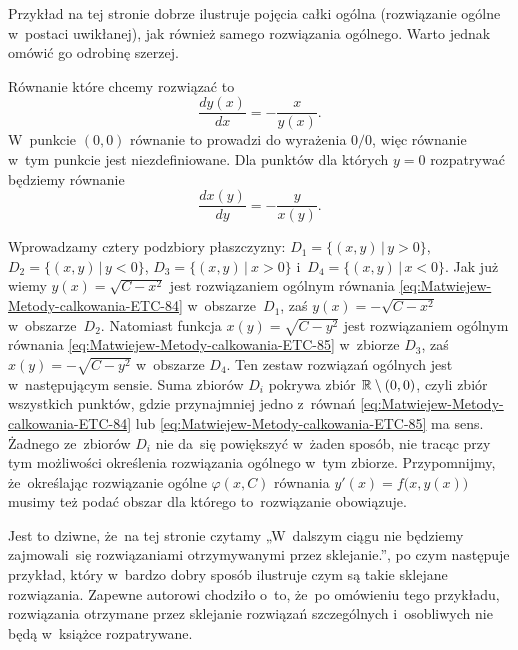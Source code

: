 \documentclass[a4paper,11pt]{article}
\numberwithin{equation}{section}
\begin{document}
\VerSpaceFour





\noindent
{} Przykład na tej stronie dobrze ilustruje pojęcia całki ogólna
(rozwiązanie ogólne w~postaci uwikłanej), jak również samego rozwiązania
ogólnego. Warto jednak omówić go odrobinę szerzej.

Równanie które chcemy rozwiązać to
\begin{equation}
  \label{eq:Matwiejew-Metody-calkowania-ETC-84}
  \frac{ d y( x ) }{ d x } = -\frac{ x }{ y( x ) }.
\end{equation}
W~punkcie $( 0, 0 )$ równanie to prowadzi do wyrażenia $0 / 0$, więc
równanie w~tym punkcie jest niezdefiniowane. Dla punktów dla których
$y = 0$ rozpatrywać będziemy równanie
\begin{equation}
  \label{eq:Matwiejew-Metody-calkowania-ETC-85}
  \frac{ d x( y ) }{ d y } = -\frac{ y }{ x( y ) }.
\end{equation}

Wprowadzamy cztery podzbiory płaszczyzny:
$D_{ 1 } = \{ ( x, y ) \, | \, y > 0 \}$,
$D_{ 2 } = \{ ( x, y ) \, | \, y < 0 \}$,
$D_{ 3 } = \{ ( x, y ) \, | \ x > 0 \}$
i~$D_{ 4 } = \{ ( x, y ) \, | \, x < 0 \}$. Jak już wiemy
$y( x ) = \sqrt{ C - x^{ 2 } }$ jest rozwiązaniem ogólnym równania
\eqref{eq:Matwiejew-Metody-calkowania-ETC-84} w~obszarze~$D_{ 1 }$, zaś
$y( x ) = -\sqrt{ C - x^{ 2 } }$ w~obszarze~$D_{ 2 }$. Natomiast funkcja
$x( y ) = \sqrt{ C - y^{ 2 } }$ jest rozwiązaniem ogólnym równania
\eqref{eq:Matwiejew-Metody-calkowania-ETC-85} w~zbiorze $D_{ 3 }$, zaś
$x( y ) = -\sqrt{ C - y^{ 2 } }$ w~obszarze $D_{ 4 }$. Ten zestaw rozwiązań
ogólnych jest w~następującym sensie. Suma zbiorów $D_{ i }$ pokrywa zbiór
$\mathbb{R} \setminus { ( 0, 0 ) }$, czyli zbiór wszystkich punktów, gdzie przynajmniej
jedno z~równań \eqref{eq:Matwiejew-Metody-calkowania-ETC-84} lub
\eqref{eq:Matwiejew-Metody-calkowania-ETC-85} ma sens. Żadnego ze~zbiorów
$D_{ i }$ nie da~się powiększyć w~żaden sposób, nie tracąc przy tym
możliwości określenia rozwiązania ogólnego w~tym zbiorze. Przypomnijmy,
że~określając rozwiązanie ogólne $\varphi( x, C )$ równania
$y'( x ) = f\big( x, y( x ) \big)$ musimy też podać obszar dla którego
to~rozwiązanie obowiązuje.

\VerSpaceFour





\noindent
{} Jest to dziwne, że~na tej stronie czytamy „W~dalszym ciągu nie
będziemy zajmowali~się rozwiązaniami otrzymywanymi przez sklejanie.”, po
czym następuje przykład, który w~bardzo dobry sposób ilustruje czym są
takie sklejane rozwiązania. Zapewne autorowi chodziło o~to, że~po omówieniu
tego przykładu, rozwiązania otrzymane przez sklejanie rozwiązań szczególnych
i~osobliwych nie będą w~książce rozpatrywane.
\end{document}
